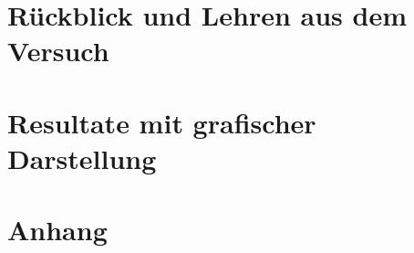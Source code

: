 \documentclass{article}[11pt,paper=A4, margin=1cm]
\begin{document}
\section {Rückblick und Lehren aus dem Versuch}

\newpage
\section {Resultate mit grafischer Darstellung}

\newpage


\appendix
\section {Anhang}


\newpage
\listoffigures

\newpage

\printbibliography
\end{document}
